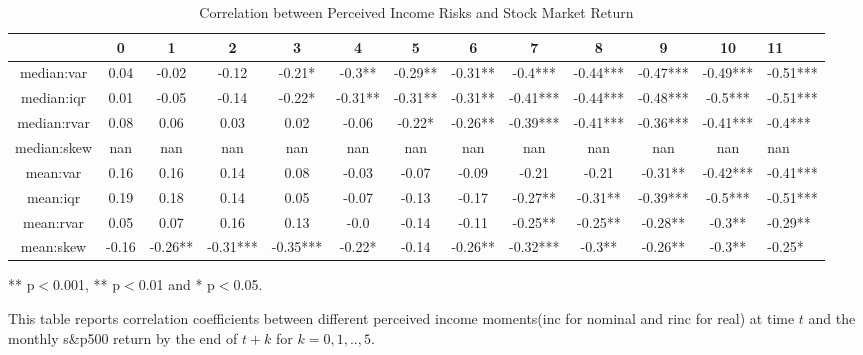 
\begin{table}[ht]
\centering
\begin{threeparttable}
\caption{Correlation between Perceived Income Risks and Stock Market Return}
\label{macro_corr}\begin{tabular}{ccccccccccccl}
\toprule
{} &      0 &        1 &         2 &         3 &        4 &        5 &        6 &         7 &         8 &         9 &        10 &        11 \\
\midrule
median:var  &   0.04 &    -0.02 &     -0.12 &    -0.21* &   -0.3** &  -0.29** &  -0.31** &   -0.4*** &  -0.44*** &  -0.47*** &  -0.49*** &  -0.51*** \\
median:iqr  &   0.01 &    -0.05 &     -0.14 &    -0.22* &  -0.31** &  -0.31** &  -0.31** &  -0.41*** &  -0.44*** &  -0.48*** &   -0.5*** &  -0.51*** \\
median:rvar &   0.08 &     0.06 &      0.03 &      0.02 &    -0.06 &   -0.22* &  -0.26** &  -0.39*** &  -0.41*** &  -0.36*** &  -0.41*** &   -0.4*** \\
median:skew &    nan &      nan &       nan &       nan &      nan &      nan &      nan &       nan &       nan &       nan &       nan &       nan \\
mean:var    &   0.16 &     0.16 &      0.14 &      0.08 &    -0.03 &    -0.07 &    -0.09 &     -0.21 &     -0.21 &   -0.31** &  -0.42*** &  -0.41*** \\
mean:iqr    &   0.19 &     0.18 &      0.14 &      0.05 &    -0.07 &    -0.13 &    -0.17 &   -0.27** &   -0.31** &  -0.39*** &   -0.5*** &  -0.51*** \\
mean:rvar   &   0.05 &     0.07 &      0.16 &      0.13 &     -0.0 &    -0.14 &    -0.11 &   -0.25** &   -0.25** &   -0.28** &    -0.3** &   -0.29** \\
mean:skew   &  -0.16 &  -0.26** &  -0.31*** &  -0.35*** &   -0.22* &    -0.14 &  -0.26** &  -0.32*** &    -0.3** &   -0.26** &    -0.3** &    -0.25* \\
\bottomrule
\end{tabular}
\begin{tablenotes}
\item *** p$<$0.001, ** p$<$0.01 and * p$<$0.05. 
\item This table reports correlation coefficients between different perceived income moments(inc for nominal 
and rinc for real) at time 
$t$ and the monthly s\&p500 return by the end of $t+k$ for $k=0,1,..,5$. 
\end{tablenotes}
\end{threeparttable}
\end{table}